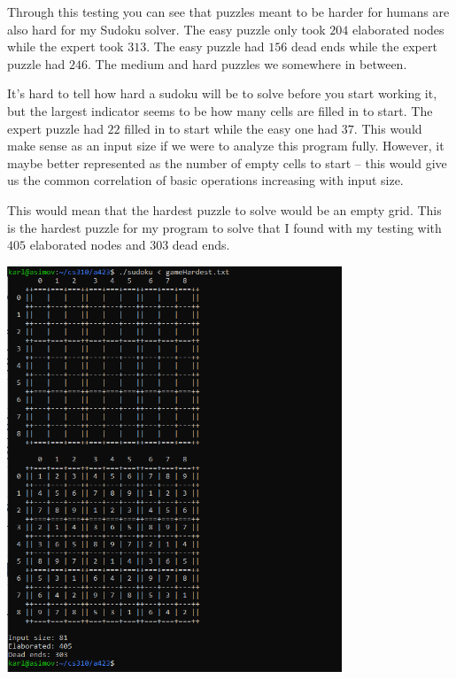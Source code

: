 \documentclass[11pt]{article}
\begin{document}
Through this testing you can see that puzzles meant to be harder for humans are also hard for my Sudoku solver. The easy puzzle only took $204$ elaborated nodes while the expert took $313$. The easy puzzle had $156$ dead ends while the expert puzzle had $246$. The medium and hard puzzles we somewhere in between.

It's hard to tell how hard a sudoku will be to solve before you start working it, but the largest indicator seems to be how many cells are filled in to start. The expert puzzle had $22$ filled in to start while the easy one had $37$. This would make sense as an input size if we were to analyze this program fully. However, it maybe better represented as the number of empty cells to start -- this would give us the common correlation of basic operations increasing with input size.

This would mean that the hardest puzzle to solve would be an empty grid. This is the hardest puzzle for my program to solve that I found with my testing with $405$ elaborated nodes and $303$ dead ends.

\begin{center}
    \includegraphics[width=0.75\textwidth]{hardest.png}
\end{center}
\end{document}
